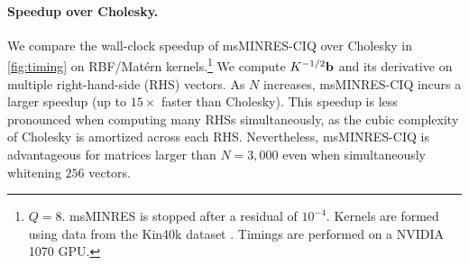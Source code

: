 \paragraph{Speedup over Cholesky.}
We compare the wall-clock speedup of msMINRES-CIQ over Cholesky in \cref{fig:timing} on RBF/Mat\'ern kernels.\footnote{
  $Q=8$.
  msMINRES is stopped after a residual of $10^{-4}$.
  Kernels are formed using data from the Kin40k dataset \citep{asuncion2007uci}.
  Timings are performed on a NVIDIA 1070 GPU.
}
We compute $K^{-1/2} \mathbf{b}$ and its derivative on multiple right-hand-side (RHS) vectors.
As $N$ increases, msMINRES-CIQ incurs a larger speedup (up to $15\times$ faster than Cholesky).
This speedup is less pronounced when computing many RHSs simultaneously, as the cubic complexity of Cholesky is amortized across each RHS.
Nevertheless, msMINRES-CIQ is advantageous for matrices larger than $N=3,\!000$ even when simultaneously whitening $256$ vectors.
